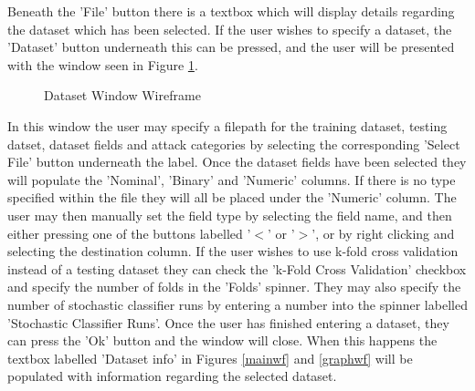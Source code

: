 \documentclass[12pt,a4paper]{article}
\begin{document}
Beneath the 'File' button there is a textbox which will display details regarding the dataset which has been selected. If the user wishes to specify a dataset, the 'Dataset' button underneath this can be pressed, and the user will be presented with the window seen in Figure \ref{datasetwf}.

\begin{figure}[H]
\caption{Dataset Window Wireframe}
\label{datasetwf}
\end{figure}

In this window the user may specify a filepath for the training dataset, testing datset, dataset fields and attack categories by selecting the corresponding 'Select File' button underneath the label. Once the dataset fields have been selected they will populate the 'Nominal', 'Binary' and 'Numeric' columns. If there is no type specified within the file they will all be placed under the 'Numeric' column. The user may then manually set the field type by selecting the field name, and then either pressing one of the buttons labelled '$<$' or '$>$', or by right clicking and selecting the destination column. If the user wishes to use k-fold cross validation instead of a testing dataset they can check the 'k-Fold Cross Validation' checkbox and specify the number of folds in the 'Folds' spinner. They may also specify the number of stochastic classifier runs by entering a number into the spinner labelled 'Stochastic Classifier Runs'. Once the user has finished entering a dataset, they can press the 'Ok' button and the window will close. When this happens the textbox labelled 'Dataset info' in Figures \ref{mainwf} and \ref{graphwf} will be populated with information regarding the selected dataset.
\end{document}
